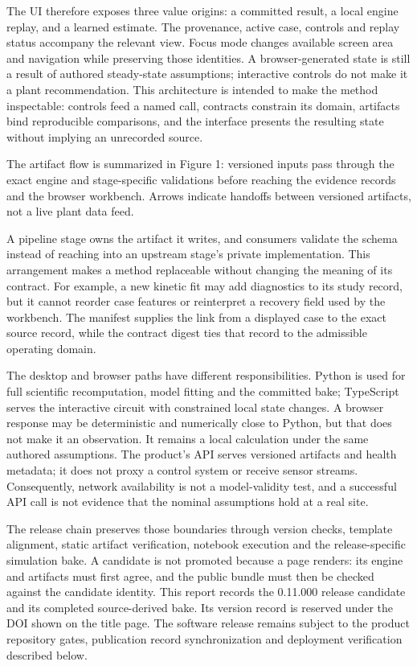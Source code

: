 \documentclass[10pt]{article}
\begin{document}
The UI therefore exposes three value origins: a committed result, a
local engine replay, and a learned estimate. The provenance, active
case, controls and replay status accompany the relevant view. Focus mode
changes available screen area and navigation while preserving those
identities. A browser-generated state is still a result of authored
steady-state assumptions; interactive controls do not make it a plant
recommendation. This architecture is intended to make the method
inspectable: controls feed a named call, contracts constrain its domain,
artifacts bind reproducible comparisons, and the interface presents the
resulting state without implying an unrecorded source.

The artifact flow is summarized in Figure 1: versioned inputs pass
through the exact engine and stage-specific validations before reaching
the evidence records and the browser workbench. Arrows indicate handoffs
between versioned artifacts, not a live plant data feed.

A pipeline stage owns the artifact it writes, and consumers validate the
schema instead of reaching into an upstream stage's private
implementation. This arrangement makes a method replaceable without
changing the meaning of its contract. For example, a new kinetic fit may
add diagnostics to its study record, but it cannot reorder case features
or reinterpret a recovery field used by the workbench. The manifest
supplies the link from a displayed case to the exact source record,
while the contract digest ties that record to the admissible operating
domain.

The desktop and browser paths have different responsibilities. Python is
used for full scientific recomputation, model fitting and the committed
bake; TypeScript serves the interactive circuit with constrained local
state changes. A browser response may be deterministic and numerically
close to Python, but that does not make it an observation. It remains a
local calculation under the same authored assumptions. The product's API
serves versioned artifacts and health metadata; it does not proxy a
control system or receive sensor streams. Consequently, network
availability is not a model-validity test, and a successful API call is
not evidence that the nominal assumptions hold at a real site.

The release chain preserves those boundaries through version checks,
template alignment, static artifact verification, notebook execution and
the release-specific simulation bake. A candidate is not promoted
because a page renders: its engine and artifacts must first agree, and
the public bundle must then be checked against the candidate identity.
This report records the 0.11.000 release candidate and its completed
source-derived bake. Its version record is reserved under the DOI shown
on the title page. The software release remains subject to the product
repository gates, publication record synchronization and deployment
verification described below.
\end{document}
